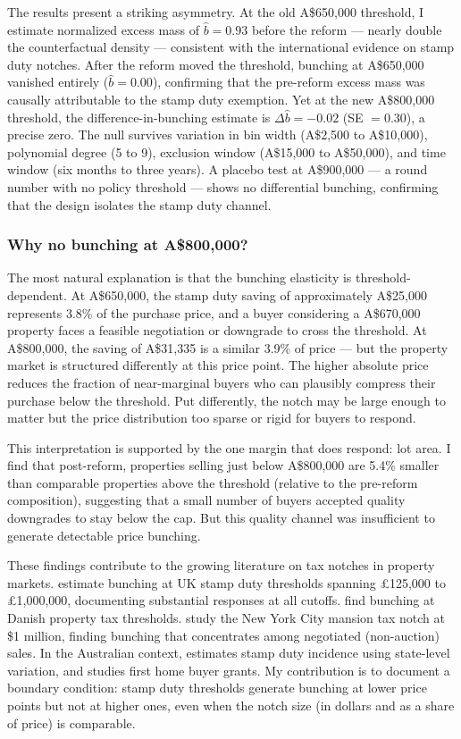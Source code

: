 \documentclass[12pt]{article}
\begin{document}
The results present a striking asymmetry. At the old A\$650,000 threshold, I estimate normalized excess mass of $\hat{b} = 0.93$ before the reform --- nearly double the counterfactual density --- consistent with the international evidence on stamp duty notches. After the reform moved the threshold, bunching at A\$650,000 vanished entirely ($\hat{b} = 0.00$), confirming that the pre-reform excess mass was causally attributable to the stamp duty exemption. Yet at the new A\$800,000 threshold, the difference-in-bunching estimate is $\Delta\hat{b} = -0.02$ (SE $= 0.30$), a precise zero. The null survives variation in bin width (A\$2,500 to A\$10,000), polynomial degree (5 to 9), exclusion window (A\$15,000 to A\$50,000), and time window (six months to three years). A placebo test at A\$900,000 --- a round number with no policy threshold --- shows no differential bunching, confirming that the design isolates the stamp duty channel.

\subsubsection*{Why no bunching at A\$800,000?} The most natural explanation is that the bunching elasticity is threshold-dependent. At A\$650,000, the stamp duty saving of approximately A\$25,000 represents 3.8\% of the purchase price, and a buyer considering a A\$670,000 property faces a feasible negotiation or downgrade to cross the threshold. At A\$800,000, the saving of A\$31,335 is a similar 3.9\% of price --- but the property market is structured differently at this price point. The higher absolute price reduces the fraction of near-marginal buyers who can plausibly compress their purchase below the threshold. Put differently, the notch may be large enough to matter but the price distribution too sparse or rigid for buyers to respond.

This interpretation is supported by the one margin that does respond: lot area. I find that post-reform, properties selling just below A\$800,000 are 5.4\% smaller than comparable properties above the threshold (relative to the pre-reform composition), suggesting that a small number of buyers accepted quality downgrades to stay below the cap. But this quality channel was insufficient to generate detectable price bunching.

These findings contribute to the growing literature on tax notches in property markets. \citet{best2018} estimate bunching at UK stamp duty thresholds spanning \pounds125,000 to \pounds1,000,000, documenting substantial responses at all cutoffs. \citet{skov2020} find bunching at Danish property tax thresholds. \citet{kopczuk2016} study the New York City mansion tax notch at \$1 million, finding bunching that concentrates among negotiated (non-auction) sales. In the Australian context, \citet{leigh2010} estimates stamp duty incidence using state-level variation, and \citet{davidoff2016} studies first home buyer grants. My contribution is to document a boundary condition: stamp duty thresholds generate bunching at lower price points but not at higher ones, even when the notch size (in dollars and as a share of price) is comparable.
\end{document}
